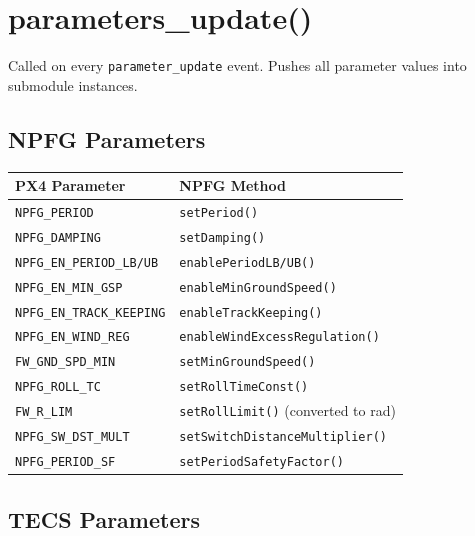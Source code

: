 \documentclass[12pt,a4paper]{article}
\begin{document}
\section{parameters\_update()}

Called on every \texttt{parameter\_update} event. Pushes all parameter
values into submodule instances.

\subsection{NPFG Parameters}

\begin{center}
\begin{tabular}{ll}
\toprule
PX4 Parameter & NPFG Method \\
\midrule
\texttt{NPFG\_PERIOD}            & \texttt{setPeriod()} \\
\texttt{NPFG\_DAMPING}           & \texttt{setDamping()} \\
\texttt{NPFG\_EN\_PERIOD\_LB/UB} & \texttt{enablePeriodLB/UB()} \\
\texttt{NPFG\_EN\_MIN\_GSP}      & \texttt{enableMinGroundSpeed()} \\
\texttt{NPFG\_EN\_TRACK\_KEEPING}& \texttt{enableTrackKeeping()} \\
\texttt{NPFG\_EN\_WIND\_REG}     & \texttt{enableWindExcessRegulation()} \\
\texttt{FW\_GND\_SPD\_MIN}       & \texttt{setMinGroundSpeed()} \\
\texttt{NPFG\_ROLL\_TC}          & \texttt{setRollTimeConst()} \\
\texttt{FW\_R\_LIM}              & \texttt{setRollLimit()} (converted to rad) \\
\texttt{NPFG\_SW\_DST\_MULT}     & \texttt{setSwitchDistanceMultiplier()} \\
\texttt{NPFG\_PERIOD\_SF}        & \texttt{setPeriodSafetyFactor()} \\
\bottomrule
\end{tabular}
\end{center}

\subsection{TECS Parameters}
\end{document}
